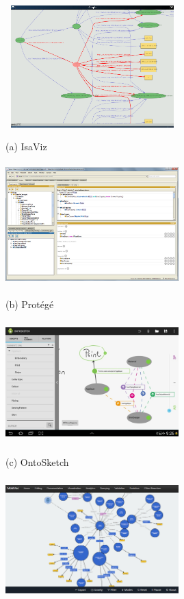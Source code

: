\begin{figure}[htb]

\begin{minipage}[b]{.48\linewidth}
  \centering
  \centerline{\includegraphics[width=6.7cm, height=4.7cm]{img/isaviz.png}}
  \centerline{(a) IsaViz}\medskip
\end{minipage}
\hfill
\begin{minipage}[b]{0.48\linewidth}
  \centering
  \centerline{\includegraphics[width=6.7cm, height=4.7cm]{img/protege.jpg}}
  \centerline{(b) Protégé}\medskip
\end{minipage}
\begin{minipage}[b]{.48\linewidth}
  \centering
  \centerline{\includegraphics[width=6.7cm, height=4.7cm]{img/ontosketch.png}}
  \centerline{(c) OntoSketch}\medskip
\end{minipage}
\hfill
\begin{minipage}[b]{0.48\linewidth}
  \centering
  \centerline{\includegraphics[width=6.7cm, height=4.7cm]{img/vocol.png}}

\end{minipage}
\end{figure}
